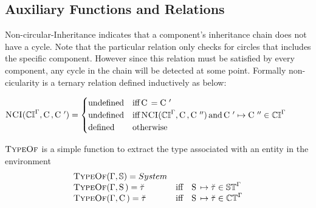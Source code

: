 \documentclass{article}
\begin{document}
\subsection{Auxiliary Functions and Relations}

Non-circular-Inheritance indicates that a component's inheritance
chain does not have a cycle. Note that the particular relation only
checks for circles that includes the specific component. However since
this relation must be satisfied by every component, any cycle in the
chain will be detected at some point. Formally non-cicularity is a
ternary relation defined inductively as below:

\begin{math}
  \text{\sc NCI}(\mathbb{CI}^{\Gamma}, \mathop{\textrm{C}}\,, \mathop{\textrm{C}}\,') =
  \begin{cases}
    \text{undefined} & \mathop{\text{iff}} \mathop{\textrm{C}}\, = \mathop{\textrm{C}}\,' \\ 
    \text{undefined} &\mathop{\text{iff}} \text{\sc NCI}(\mathbb{CI}^{\Gamma}, \mathop{\textrm{C}}\,, \mathop{\textrm{C}}\,'')
      \mathop{\text{and}} \mathop{\textrm{C}}\,' \mapsto \mathop{\textrm{C}}\,'' \in \mathbb{CI}^{\Gamma} \\ 
    \text{defined} & \textrm{otherwise}  
  \end{cases}
\end{math}

$\text{\sc TypeOf}$ is a simple function to extract the type associated with an entity in the environment
\begin{displaymath}
  \begin{array}{l l l}
    \text{\sc TypeOf}(\Gamma, \mathbb{S}) = System \\
    \text{\sc TypeOf}(\Gamma, \mathop{\textrm{S}}\,) = \breve{\tau} & \mathop{\text{iff}} & \mathop{\textrm{S}}\, \mapsto \breve{\tau} \in \mathbb{ST}^{\Gamma} \\ 
    \text{\sc TypeOf}(\Gamma, \mathop{\textrm{C}}\,) = \breve{\tau} & \mathop{\text{iff}} & \mathop{\textrm{S}}\, \mapsto \breve{\tau} \in \mathbb{CT}^{\Gamma} \\ 
  \end{array} 
\end{displaymath}
\end{document}
